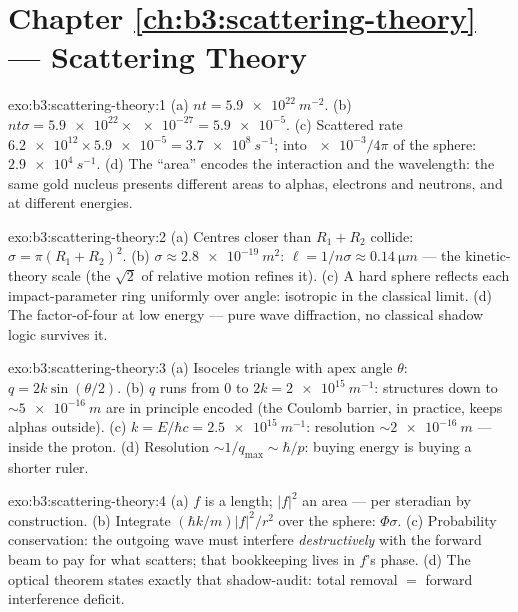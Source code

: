 \section*{Chapter \ref{ch:b3:scattering-theory} --- Scattering Theory}

\begin{solution}{exo:b3:scattering-theory:1}
(a) $nt = \qty{5.9e22}{m^{-2}}$. (b) $nt\sigma = \num{5.9e22}
\times \num{e-27} = \num{5.9e-5}$. (c) Scattered rate
$\num{6.2e12} \times \num{5.9e-5} = \qty{3.7e8}{s^{-1}}$; into
$\num{e-3}/4\pi$ of the sphere: $\qty{2.9e4}{s^{-1}}$. (d) The
``area'' encodes the interaction and the wavelength: the same gold
nucleus presents different areas to alphas, electrons and
neutrons, and at different energies.
\end{solution}

\begin{solution}{exo:b3:scattering-theory:2}
(a) Centres closer than $R_1 + R_2$ collide: $\sigma = \pi(R_1 +
R_2)^2$. (b) $\sigma \approx \qty{2.8e-19}{m^2}$: $\ell = 1/n\sigma
\approx \qty{0.14}{\micro m}$ --- the kinetic-theory scale (the
$\sqrt2$ of relative motion refines it). (c) A hard sphere
reflects each impact-parameter ring uniformly over angle:
isotropic in the classical limit. (d) The factor-of-four
 at low energy --- pure wave diffraction, no
classical shadow logic survives it.
\end{solution}

\begin{solution}{exo:b3:scattering-theory:3}
(a) Isoceles triangle with apex angle $\theta$: $q =
2k\sin(\theta/2)$. (b) $q$ runs from $0$ to $2k = \qty{2e15}{
m^{-1}}$: structures down to $\sim\qty{5e-16}{m}$ are in
principle encoded (the Coulomb barrier, in practice, keeps alphas
outside). (c) $k = E/\hbar c = \qty{2.5e15}{m^{-1}}$: resolution
$\sim\qty{2e-16}{m}$ --- inside the proton. (d) Resolution
$\sim 1/q_{\max} \sim \hbar/p$: buying energy is buying a shorter
ruler.
\end{solution}

\begin{solution}{exo:b3:scattering-theory:4}
(a) $f$ is a length; $|f|^2$ an area --- per steradian by
construction. (b) Integrate $(\hbar k/m)|f|^2/r^2$ over the
sphere: $\Phi\sigma$. (c) Probability conservation: the outgoing
wave must interfere \emph{destructively} with the forward beam to
pay for what scatters; that bookkeeping lives in $f$'s phase. (d)
The optical theorem states exactly that shadow-audit: total
removal $=$ forward interference deficit.
\end{solution}

